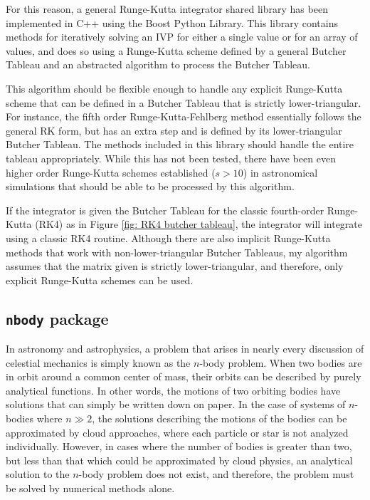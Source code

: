 \documentclass[onecolumn,titlepage,letterpaper,10pt]{article}
\begin{document}
For this reason, a general Runge-Kutta integrator shared library
has been implemented in C++ using the Boost Python Library. This library
contains methods for iteratively solving an IVP for either a single value or for
an array of values, and does so using a Runge-Kutta scheme defined by a
general Butcher Tableau and an abstracted algorithm to process the Butcher
Tableau.

This algorithm should be flexible enough to handle any explicit Runge-Kutta
scheme that can be defined in a Butcher Tableau that is strictly
lower-triangular. For instance, the fifth order Runge-Kutta-Fehlberg method
essentially follows the general RK form, but has an extra step and is defined
by its lower-triangular Butcher Tableau.
The methods included in this library should handle the entire tableau
appropriately. While this has not been tested, there have been even higher order
Runge-Kutta schemes established ($s> 10$) in astronomical simulations that
should be able to be processed by this algorithm.

If the integrator is given the Butcher Tableau for the classic
fourth-order Runge-Kutta (RK4) as in Figure \ref{fig: RK4 butcher tableau}, the
integrator will integrate using a classic RK4 routine.
Although there are also
implicit Runge-Kutta methods that work with non-lower-triangular Butcher Tableaus,
my algorithm assumes that the matrix given is strictly lower-triangular, and
therefore, only explicit Runge-Kutta schemes can be used.


\subsection{\texttt{nbody} package}
In astronomy and astrophysics, a problem that arises in nearly every discussion
of celestial mechanics is simply known as the $n$-body problem. When two bodies
are in orbit around a common center of mass, their orbits can be described by
purely analytical functions. In other words, the motions of two orbiting
bodies have solutions that can simply be written down on paper. In the case of
systems of $n$-bodies where $n\gg2$, the solutions describing the motions of the
bodies can be approximated by cloud approaches, where each particle or star is
not analyzed individually. However, in cases where the number of bodies is
greater than two, but less than that which could be approximated by cloud
physics, an analytical solution to the $n$-body problem does not exist, and
therefore, the problem must be solved by numerical methods alone.
\end{document}
